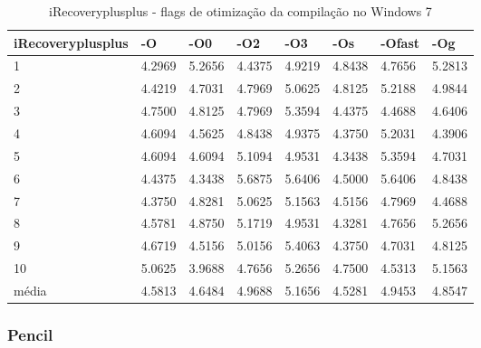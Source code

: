 \begin{table}[!ht]
\centering
\caption{iRecoveryplusplus - flags de otimização da compilação no Windows 7}
\label{tab:otimizacao_compilacao:windows:irecoveryplusplus}
\begin{tabular}{llllllll}
\textbf{iRecoveryplusplus} & \textbf{-O}  & \textbf{-O0}   & \textbf{-O2} & \textbf{-O3} & \textbf{-Os} & \textbf{-Ofast} & \textbf{-Og} \\ \toprule
1                          &   4.2969     &    5.2656      & 4.4375       & 4.9219       &  4.8438      &   4.7656        &  5.2813  \\ 
2                          &   4.4219     &    4.7031      & 4.7969       & 5.0625       &  4.8125      &   5.2188        &  4.9844  \\ 
3                          &   4.7500     &    4.8125      & 4.7969       & 5.3594       &  4.4375      &   4.4688        &  4.6406  \\ 
4                          &   4.6094     &    4.5625      & 4.8438       & 4.9375       &  4.3750      &   5.2031        &  4.3906  \\ 
5                          &   4.6094     &    4.6094      & 5.1094       & 4.9531       &  4.3438      &   5.3594        &  4.7031  \\ 
6                          &   4.4375     &    4.3438      & 5.6875       & 5.6406       &  4.5000      &   5.6406        &  4.8438  \\ 
7                          &   4.3750     &    4.8281      & 5.0625       & 5.1563       &  4.5156      &   4.7969        &  4.4688  \\ 
8                          &   4.5781     &    4.8750      & 5.1719       & 4.9531       &  4.3281      &   4.7656        &  5.2656  \\ 
9                          &   4.6719     &    4.5156      & 5.0156       & 5.4063       &  4.3750      &   4.7031        &  4.8125  \\ 
10                         &   5.0625     &    3.9688      & 4.7656       & 5.2656       &  4.7500      &   4.5313        &  5.1563  \\ \bottomrule
média                      &   4.5813     &    4.6484      & 4.9688       & 5.1656       &  4.5281      &   4.9453        &  4.8547  \\ 
\end{tabular}
\end{table}

\clearpage
\subsubsection*{Pencil}

